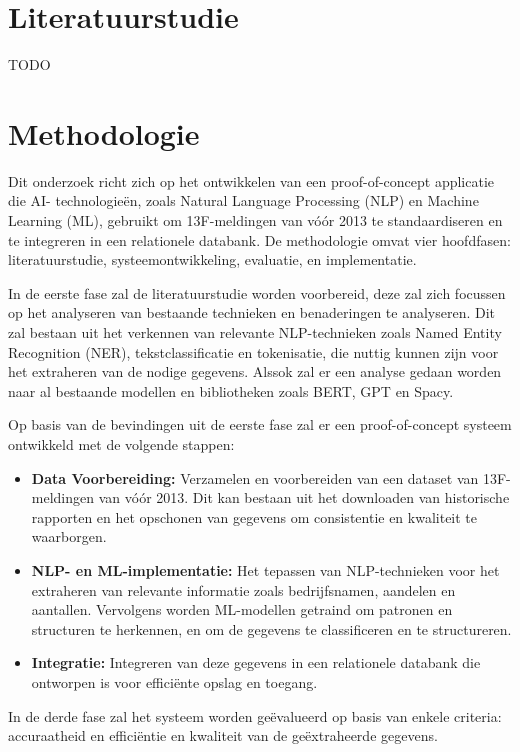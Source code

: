 \documentclass{hogent-article}
\begin{document}
\section{Literatuurstudie}%
\label{sec:literatuurstudie}

TODO

\section{Methodologie}


Dit onderzoek richt zich op het ontwikkelen van een proof-of-concept applicatie die AI- technologieën, zoals Natural Language Processing (NLP) en Machine Learning (ML), gebruikt om 13F-meldingen van vóór 2013 te standaardiseren en te integreren in een relationele databank. De methodologie omvat vier hoofdfasen: literatuurstudie, systeemontwikkeling, evaluatie, en implementatie.

In de eerste fase zal de literatuurstudie worden voorbereid, deze zal zich focussen op het analyseren van bestaande technieken en benaderingen te analyseren. Dit zal bestaan uit het verkennen van relevante NLP-technieken zoals Named Entity Recognition (NER), tekstclassificatie en tokenisatie, die nuttig kunnen zijn voor het extraheren van de nodige gegevens. Alssok zal er een analyse gedaan worden naar al bestaande modellen en bibliotheken zoals BERT, GPT en Spacy.

Op basis van de bevindingen uit de eerste fase zal er een proof-of-concept systeem ontwikkeld met de volgende stappen:
\begin{itemize}
    \item \textbf{Data Voorbereiding:} Verzamelen en voorbereiden van een dataset van 13F-meldingen van vóór 2013. Dit kan bestaan uit het downloaden van historische rapporten en het opschonen van gegevens om consistentie en kwaliteit te waarborgen.
    \item \textbf{NLP- en ML-implementatie:} Het tepassen van NLP-technieken voor het extraheren van relevante informatie zoals bedrijfsnamen, aandelen en aantallen. Vervolgens worden ML-modellen getraind om patronen en structuren te herkennen, en om de gegevens te classificeren en te structureren.
    \item \textbf{Integratie:} Integreren van deze gegevens in een relationele databank die ontworpen is voor efficiënte opslag en toegang.
\end{itemize}

In de derde fase zal het systeem worden geëvalueerd op basis van enkele criteria: accuraatheid en efficiëntie en kwaliteit van de geëxtraheerde gegevens.
\end{document}
